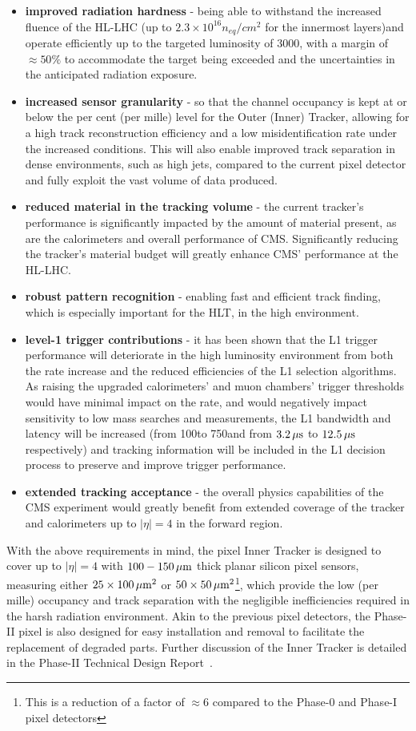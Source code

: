 \begin{itemize}
\item \textbf{improved radiation hardness} - being able to withstand the increased fluence of the HL-LHC (up to $2.3\times10^{16} n_{eq}/cm^{2}$ for the innermost layers)and operate efficiently up to the targeted luminosity of 3000\fbinv, with a margin of $\approx50\%$ to accommodate the target being exceeded and the uncertainties in the anticipated radiation exposure.
\item \textbf{increased sensor granularity} - so that the channel occupancy is kept at or below the per cent (per mille) level for the Outer (Inner) Tracker, allowing for a high track reconstruction efficiency and a low misidentification rate under the increased \PU conditions. This will also enable improved track separation in dense environments, such as high \pT jets, compared to the current pixel detector and fully exploit the vast volume of data produced.
\item \textbf{reduced material in the tracking volume} - the current tracker's performance is significantly impacted by the amount of material present, as are the calorimeters and overall performance of CMS.
Significantly reducing the tracker's material budget will greatly enhance CMS' performance at the HL-LHC.
\item \textbf{robust pattern recognition} - enabling fast and efficient track finding, which is especially important for the HLT, in the high \PU environment.
\item \textbf{level-1 trigger contributions} - it has been shown that the L1 trigger performance will deteriorate in the high luminosity environment from both the rate increase and the reduced efficiencies of the L1 selection algorithms.
As raising the upgraded calorimeters' and muon chambers' trigger thresholds would have minimal impact on the rate, and would negatively impact sensitivity to low mass searches and measurements, the L1 bandwidth and latency will be increased (from 100\kHz to 750\kHz and from $3.2\,\mu\text{s}$ to $12.5\,\mu\text{s}$ respectively) and tracking information will be included in the L1 decision process to preserve and improve trigger performance.
\item \textbf{extended tracking acceptance} - the overall physics capabilities of the CMS experiment would greatly benefit from extended coverage of the tracker and calorimeters up to $|\eta| = 4$ in the forward region.
\end{itemize}

With the above requirements in mind, the pixel Inner Tracker is designed to cover up to $|\eta| = 4$ with $100-150\,\mu\text{m}$ thick planar silicon pixel sensors, measuring either $25\times100\,\mu\text{m}^{2}$ or $50\times50\,\mu\text{m}^{2}$\footnote{This is a reduction of a factor of $\approx 6$ compared to the Phase-0 and Phase-I pixel detectors}, which provide the low (per mille) occupancy and track separation with the negligible inefficiencies required in the harsh radiation environment.
Akin to the previous pixel detectors, the Phase-II pixel is also designed for easy installation and removal to facilitate the replacement of degraded parts.
Further discussion of the Inner Tracker is detailed in the Phase-II Technical Design Report~\cite{P2TrackerTDR}.

